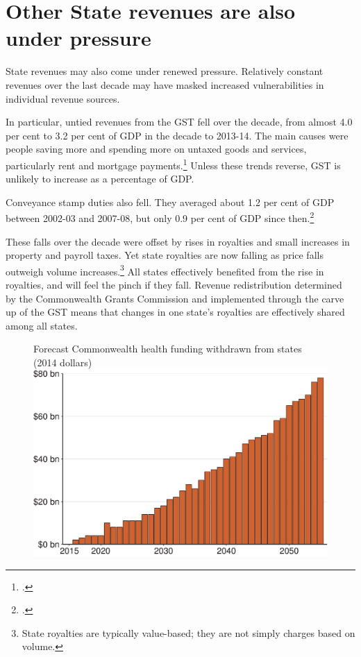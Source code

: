 \section{Other State revenues are also under pressure\label{sec:FISCAL-4-4}}
State revenues may also come under renewed pressure. Relatively constant revenues over the last decade may have masked increased vulnerabilities in individual revenue sources.

In particular, untied revenues from the GST fell over the decade, from almost 4.0 per cent to 3.2 per cent of GDP in the decade to 2013-14. The main causes were people saving more and spending more on untaxed goods and services, particularly rent and mortgage payments.\footcite[][34]{DaleyWoodWeidmannEtAl2014}  Unless these trends reverse, GST is unlikely to increase as a percentage of GDP.

Conveyance stamp duties also fell. They averaged about 1.2 per cent of GDP between 2002-03 and 2007-08, but only 0.9 per cent of GDP since then.\footcite{PBO2015a} 

These falls over the decade were offset by rises in royalties and small increases in property and payroll taxes. Yet state royalties are now falling as price falls outweigh volume increases.\footnote{State royalties are typically value-based; they are not simply charges based on volume.}  All states effectively benefited from the rise in royalties, and will feel the pinch if they fall. Revenue redistribution determined by the Commonwealth Grants Commission and implemented through the carve up of the GST means that changes in one state’s royalties are effectively shared among all states.

\begin{figure}[hbp]
%
{Forecast Commonwealth health funding withdrawn from states (2014 dollars)}
\includegraphics[width=\columnwidth]{Fiscal-challenges/figure/Figure15-1.pdf}
\end{figure}

